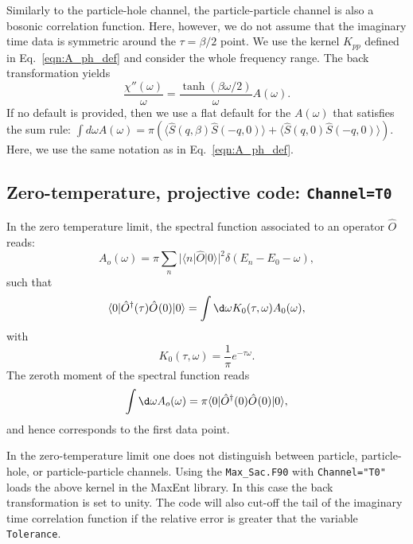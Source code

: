Similarly to the particle-hole channel, the particle-particle channel is also a bosonic correlation function. Here, however, we do not assume that the  imaginary time data is symmetric around   the $\tau = \beta/2$ point.  We use the kernel $K_{pp}$ 
defined in Eq.~\eqref{eqn:A_ph_def}  and consider the whole frequency range. 
The back transformation  yields
\begin{equation}
 \frac{\chi''(\omega)} {\omega}   = \frac{\tanh \left( \beta \omega/2 \right) }{ \omega }   A(\omega) .
\end{equation}
If no default is provided, then we use a flat default for the $A(\omega)$ that satisfies the sum rule: $ \int d \omega A(\omega) =  \pi  \left(\langle \hat{S}(q,\beta) \hat{S}(-q,0) \rangle  +
\langle \hat{S}(q,0) \hat{S}(-q,0) \rangle \right) $. Here, we use the same notation as in Eq.~\eqref{eqn:A_ph_def}.


\subsection{Zero-temperature, projective code:  \texttt{Channel=T0}}

 In the zero temperature limit,  the spectral function associated to an operator $\hat{O} $    reads:
 \begin{equation}
 	  A_o(\omega)    = \pi  \sum_{n}    | \langle n  | \hat{O} | 0 \rangle |^2 \delta( E_n - E_0 - \omega) ,
 \end{equation}
 such that 
 \begin{equation}
 	\langle 0 | \hat{O}^{\dagger}(\tau) \hat{O}^{}(0) | 0 \rangle =  \int \d\omega  K_0(\tau,\omega) A_0(\omega) ,
 \end{equation}
 with 
 \begin{equation}
 	K_0(\tau,\omega)  = \frac{1}{\pi}e^{-\tau \omega}.
 \end{equation}
 The zeroth moment of the spectral function reads
 \begin{equation}
  \int \d \omega A_o(\omega) = \pi \langle 0 | \hat{O}^{\dagger}(0) \hat{O}^{}(0) | 0 \rangle, 
 \end{equation}
 and hence corresponds to the first data point.
 
 In the zero-temperature limit one does not distinguish between  particle, particle-hole, or particle-particle channels.
 Using the \texttt{Max\_Sac.F90}  with \texttt{Channel="T0"} loads the above kernel in the MaxEnt library. In this case the back  transformation is set to unity. 
 The code will also cut-off the tail of the  imaginary time correlation function  if the relative error is greater that the variable \texttt{Tolerance}. 
 
